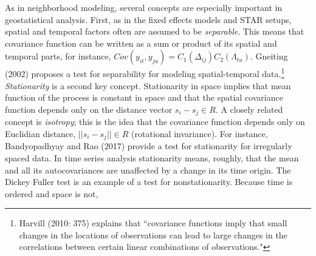 \documentclass[12pt]{article}
\begin{document}
As in neighborhood modeling, several concepts are especially important in geostatistical
analysis. First, as in the fixed effects models and STAR setups, spatial and temporal
factors often are assumed to be \emph{separable}. This means that covariance function can be written as a
sum or product of its spatial and temporal parts,
for instance, $Cov(y_{it},y_{ju}) = C_1(\Delta_{ij})C_2(\Lambda_{tu})$. Gneiting (2002) proposes
a test for separability for modeling spatial-temporal data.\footnote{Harvill (2010: 375) explains
that ``covariance functions imply that small changes in the locations of
observations can lead to large changes in the correlations between certain linear combinations
of observations."}
\textit{Stationarity} is a second key concept. Stationarity in space implies that mean function of
the process is constant in space and that the spatial covariance function depends only on the
distance vector $s_i - s_j \in R $. A closely related concept is \emph{isotropy}; this is the
idea that the covariance function depends only on
Euclidian distance, $||s_i - s_j|| \in R$ (rotational invariance). For instance,
 Bandyopadhyay and Rao (2017) provide a test for
stationarity for irregularly spaced data.  In time series analysis stationarity means, roughly, that the mean and
all its autocovariances are unaffected by a change in its time origin. The Dickey Fuller
test is an example of a test for nonstationarity.  Because time is ordered and space is not,
\end{document}
